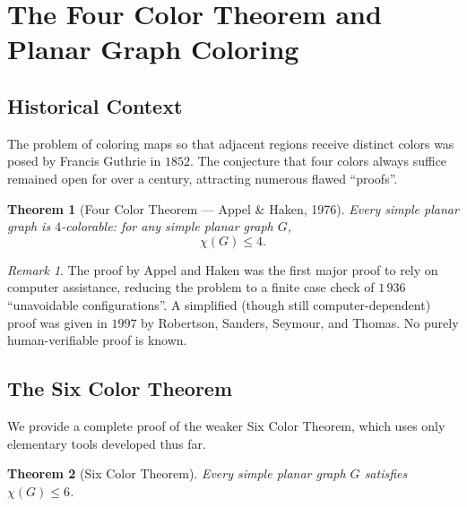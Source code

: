\documentclass[12pt,a4paper]{article}
\theoremstyle{definition}
\theoremstyle{plain}
\newtheorem{theorem}{Theorem}[section]
\theoremstyle{remark}
\newtheorem{remark}{Remark}[section]
\begin{document}
\section{The Four Color Theorem and Planar Graph Coloring}
\label{sec:four-color}

\subsection{Historical Context}

The problem of coloring maps so that adjacent regions receive distinct colors
was posed by Francis Guthrie in $1852$.  The conjecture that four colors always
suffice remained open for over a century, attracting numerous flawed ``proofs''.

\begin{theorem}[Four Color Theorem — Appel \& Haken, 1976]\label{thm:4ct}
  Every simple planar graph is $4$-colorable: for any simple planar graph $G$,
  \[
    \chi(G) \leq 4.
  \]
\end{theorem}

\begin{remark}\label{rem:4ct-proof}
  The proof by Appel and Haken was the first major proof to rely on computer
  assistance, reducing the problem to a finite case check of $1\,936$
  ``unavoidable configurations''.  A simplified (though still
  computer-dependent) proof was given in $1997$ by Robertson, Sanders, Seymour,
  and Thomas.  No purely human-verifiable proof is known.
\end{remark}

\subsection{The Six Color Theorem}

We provide a complete proof of the weaker Six Color Theorem, which uses only
elementary tools developed thus far.

\begin{theorem}[Six Color Theorem]\label{thm:6ct}
  Every simple planar graph $G$ satisfies $\chi(G) \leq 6$.
\end{theorem}
\end{document}
